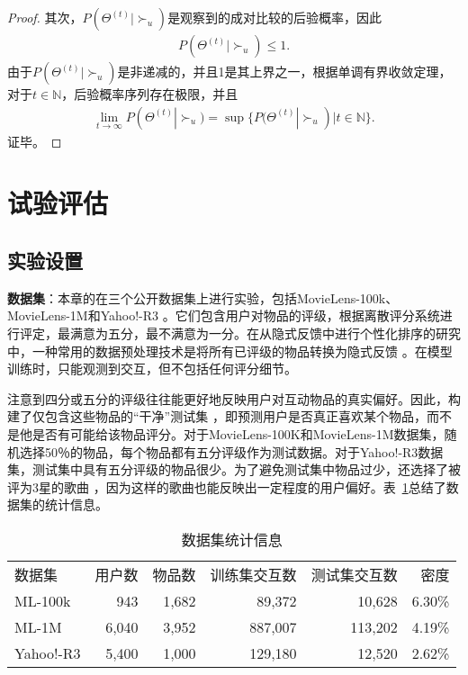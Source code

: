 \begin{proof}
\par
其次，$P({\Theta ^{(t)}}|{ \succ _u})$是观察到的成对比较的后验概率，因此
\begin{equation}\label{eq28}
	\begin{split}
		P({\Theta ^{(t)}}|{ \succ _u})\le 1.
	\end{split}
\end{equation}
由于$P({\Theta ^{(t)}}|{ \succ _u})$是非递减的，并且1是其上界之一，根据单调有界收敛定理，对于$t \in \mathbb{N}$，后验概率序列存在极限，并且
\begin{equation}\label{eq28}
	\begin{split}
		\mathop {\lim }\limits_{t \to \infty } P({\Theta ^{(t)}}|{ \succ _u}) = \sup \{ P({\Theta ^{(t)}}|{ \succ _u})| t \in \mathbb{N}\}.
	\end{split}
\end{equation}
证毕。
\end{proof}

\section{试验评估}
\subsection{实验设置}
\textbf{数据集}：本章的在三个公开数据集上进行实验，包括MovieLens-100k、MovieLens-1M和Yahoo!-R3 \cite{Xuejiao:2020:ASC}。它们包含用户对物品的评级，根据离散评分系统进行评定，最满意为五分，最不满意为一分。在从隐式反馈中进行个性化排序的研究中，一种常用的数据预处理技术是将所有已评级的物品转换为隐式反馈 \cite{Steffen:2009:UAI,Zhao:2019:FGCS,Yu:2018:CIKM}。在模型训练时，只能观测到交互，但不包括任何评分细节。

注意到四分或五分的评级往往能更好地反映用户对互动物品的真实偏好。因此，构建了仅包含这些物品的“干净”测试集 \cite{Wang:2021:WSDM}，即预测用户是否真正喜欢某个物品，而不是他是否有可能给该物品评分。对于MovieLens-100K和MovieLens-1M数据集，随机选择50％的物品，每个物品都有五分评级作为测试数据。对于Yahoo!-R3数据集，测试集中具有五分评级的物品很少。为了避免测试集中物品过少，还选择了被评为3星的歌曲 \cite{Wang:2021:WSDM}，因为这样的歌曲也能反映出一定程度的用户偏好。表~\ref{Table:Dataset}总结了数据集的统计信息。
\begin{table}[t]
	\centering
	\caption{数据集统计信息}\label{Table:Dataset}
	\begin{tabular}{lrrrrr}
		\toprule[0.5pt]
		数据集           & 用户数   & 物品数   & 训练集交互数  &测试集交互数& 密度  \\ \cline{1-6}
		ML-100k   &   943    &  1,682   &    89,372	   & 10,628&  6.30\%	\\
		ML-1M    &   6,040  &  3,952   &   887,007      & 113,202 &4.19\%  \\
		Yahoo!-R3       &   5,400  &  1,000   &   129,180      & 12,520&2.62\%  \\
		\bottomrule[0.5pt]
	\end{tabular}%
\end{table}

